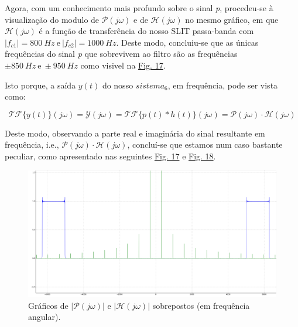 Agora, com um conhecimento mais profundo sobre o sinal \textit{p}, procedeu-se à visualização do modulo de \( \mathcal{P}(j\omega)\) e de \(\mathcal{H}(j\omega) \) no mesmo gráfico, em que \(\mathcal{H}(j\omega)\) é a função de transferência do nosso SLIT passa-banda com \(\vert f_{c1}\vert = 800\ Hz \ \text{e}\ \vert f_{c2}\vert = 1000\ Hz\). Deste modo, concluiu-se que as únicas frequências do sinal \textit{p} que sobrevivem ao filtro são as frequências \(\pm 850\ Hz\ \text{e}\ \pm 950\ Hz\) como visivel na \hyperref[fig:sistema6_absH]{Fig. 17}.


\clearpage

Isto porque, a saída \(y(t)\) do nosso \(sistema_6\), em frequência, pode ser vista como:

\[\mathcal{TF}\{y(t)\}(j\omega) = \mathcal{Y}(j\omega) = \mathcal{TF}\{p(t) * h(t)\}(j\omega) = \mathcal{P}(j\omega) \cdot \mathcal{H}(j\omega) \]

Deste modo, observando a parte real e imaginária do sinal resultante em frequência, i.e., \(\mathcal{P}(j\omega) \cdot \mathcal{H}(j\omega)\), concluí-se que estamos num caso bastante peculiar, como apresentado nas seguintes \hyperref[fig:sistema6_absH]{Fig. 17} e \hyperref[fig:multiplas_6]{Fig. 18}.

\begin{figure}[ht]
    \centering
    \includegraphics[width = 0.5\linewidth]{prints/sistema6_absH.png}   
    \caption{Gráficos de \(\vert \mathcal{P}(j\omega)\vert\) e \(\vert \mathcal{H}(j\omega)\vert\) sobrepostos (em frequência angular).}
    \label{fig:sistema6_absH}
\end{figure}

